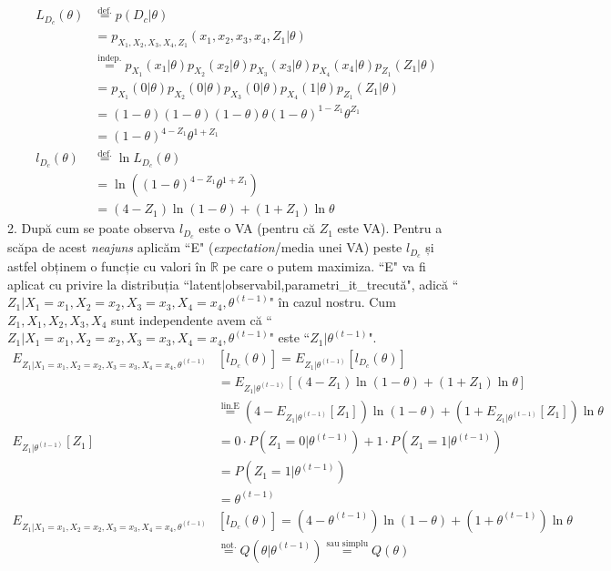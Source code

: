 \documentclass[12pt]{article}
\begin{document}
\begin{enumerate}
		\begin{align*}
		L_{D_c}(\theta) &\stackrel{\text{def.}}{=} p(D_c|\theta)\\
		&=p_{X_1,X_2,X_3,X_4,Z_1}(x_1,x_2,x_3,x_4,Z_1|\theta)\\
		&\stackrel{\text{indep.}}{=}p_{X_1}(x_1|\theta) p_{X_2}(x_2|\theta) p_{X_3}(x_3|\theta) p_{X_4}(x_4|\theta) p_{Z_1}(Z_1|\theta)\\
		&=p_{X_1}(0|\theta) p_{X_2}(0|\theta) p_{X_3}(0|\theta) p_{X_4}(1|\theta) p_{Z_1}(Z_1|\theta)\\
		&=(1-\theta)(1-\theta)(1-\theta)\theta (1-\theta)^{1-Z_1}\theta^{Z_1}\\
		&=(1-\theta)^{4-Z_1} \theta^{1+Z_1}\\
		l_{D_c}(\theta) &\stackrel{\text{def.}}{=} \ln L_{D_c}(\theta)\\
		&=\ln \left((1-\theta)^{4-Z_1} \theta^{1+Z_1}\right)\\
		&=(4-Z_1) \ln(1-\theta) + (1+Z_1)\ln \theta
		\end{align*}
		2. După cum se poate observa $l_{D_c}$ este o VA (pentru că $Z_1$ este VA). Pentru a scăpa de acest \textit{neajuns} aplicăm ``E" (\textit{expectation}/media unei VA) peste $l_{D_c}$ și astfel obținem o funcție cu valori în $\mathbb{R}$ pe care o putem maximiza. ``E" va fi aplicat cu privire la distribuția ``latent$|$observabil,parametri\_it\_trecută", adică ``$Z_1|X_1=x_1,X_2=x_2,X_3=x_3,X_4=x_4,\theta^{(t-1)}$" în cazul nostru. Cum $Z_1,X_1,X_2,X_3,X_4$ sunt independente avem că ``$Z_1|X_1=x_1,X_2=x_2,X_3=x_3,X_4=x_4,\theta^{(t-1)}$" este ``$Z_1|\theta^{(t-1)}$".
		\begin{align*}
		E_{Z_1|X_1=x_1,X_2=x_2,X_3=x_3,X_4=x_4,\theta^{(t-1)}}&[l_{D_c}(\theta)] = E_{Z_1|\theta^{(t-1)}}[l_{D_c}(\theta)]\\
		&=E_{Z_1|\theta^{(t-1)}}[(4-Z_1) \ln(1-\theta) + (1+Z_1)\ln \theta]\\
		&\stackrel{\text{lin.E}}{=}(4-E_{Z_1|\theta^{(t-1)}}[Z_1]) \ln(1-\theta) + (1+E_{Z_1|\theta^{(t-1)}}[Z_1])\ln \theta\\
		E_{Z_1|\theta^{(t-1)}}[Z_1] &= 0 \cdot P(Z_1 = 0|\theta^{(t-1)}) + 1\cdot P(Z_1 = 1|\theta^{(t-1)})\\
		& = P(Z_1 = 1|\theta^{(t-1)})\\
		& = \theta^{(t-1)}\\
		E_{Z_1|X_1=x_1,X_2=x_2,X_3=x_3,X_4=x_4,\theta^{(t-1)}}&[l_{D_c}(\theta)] = (4 - \theta^{(t-1)}) \ln(1-\theta) + (1+\theta^{(t-1)}) \ln \theta\\
		&\stackrel{\text{not.}}{=} Q(\theta|\theta^{(t-1)}) \stackrel{\text{sau simplu}}{=} Q(\theta)
		\end{align*}
		

\end{enumerate}
\end{document}
